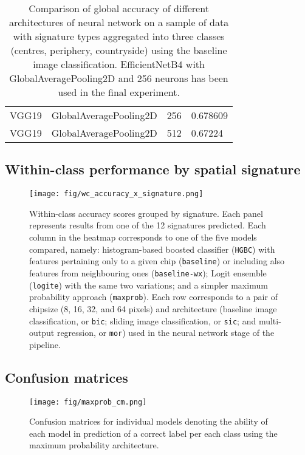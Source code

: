 \begin{table}
\begin{tabular}{llll}
           VGG19 &   GlobalAveragePooling2D &                    256 &  0.678609 \\
           VGG19 &   GlobalAveragePooling2D &                    512 &   0.67224 \\
    \bottomrule
    \end{tabular}
\caption{\label{tab:app_nns}\footnotesize Comparison of global accuracy of different
architectures of neural network on a sample of data with signature types aggregated into
three classes (centres, periphery, countryside) using the baseline image classification.
EfficientNetB4 with GlobalAveragePooling2D and 256 neurons has been used in the final
experiment.}
\end{table}


\pagebreak

\subsection{Within-class performance by spatial signature}
\label{sec:appendixB}

\begin{figure}
    \centering
    \texttt{[image: fig/wc\_accuracy\_x\_signature.png]}
    \caption{\footnotesize Within-class accuracy scores grouped by signature. Each panel
    represents results from one of the 12 signatures predicted. Each column in
    the heatmap
    corresponds to one of the five models compared, namely:
    histogram-based boosted classifier (\texttt{HGBC}) with features
    pertaining only to a given chip (\texttt{baseline}) or including also features
    from neighbouring ones (\texttt{baseline-wx}); Logit ensemble
    (\texttt{logite}) with the same two variations; and a simpler maximum
    probability approach (\texttt{maxprob}). Each row
    corresponds to a pair of chipsize (8, 16, 32, and 64 pixels)
    and architecture (baseline image classification, or \texttt{bic}; sliding
            image classification, or \texttt{sic}; and multi-output
    regression, or \texttt{mor}) used in the neural network stage of the
    pipeline.}
    \label{fig:wc_accuracy_x_signature}
\end{figure}

\pagebreak

\subsection{Confusion matrices}
\label{sec:appendixC}

\begin{figure}
    \centering
    \texttt{[image: fig/maxprob\_cm.png]}
    \caption{\footnotesize Confusion matrices for individual models denoting
    the ability of each model in prediction of a correct label per each class
    using the maximum probability architecture.}
    \label{fig:maxprob_cm}
\end{figure}


